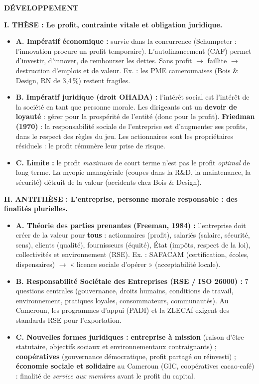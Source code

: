 \documentclass[11pt]{article}
\newcommand{\cle}[1]{{\popxbold\color{popdark}#1}}
\begin{document}
\begin{corrige}
\textbf{DÉVELOPPEMENT}

\textbf{I. THÈSE : Le profit, contrainte vitale et obligation juridique.}
\begin{itemize}
    \item \textbf{A. Impératif économique :} survie dans la concurrence (Schumpeter : l'innovation procure un profit temporaire). L'autofinancement (CAF) permet d'investir, d'innover, de rembourser les dettes. Sans profit $\rightarrow$ faillite $\rightarrow$ destruction d'emplois et de valeur. Ex. : les PME camerounaises (Bois \& Design, RN de 3,4\,\%) restent fragiles.
    \item \textbf{B. Impératif juridique (droit OHADA) :} l'\cle{intérêt social} est l'intérêt de la société en tant que personne morale. Les dirigeants ont un \textbf{devoir de loyauté} : gérer pour la prospérité de l'entité (donc pour le profit). \textbf{Friedman (1970)} : la responsabilité sociale de l'entreprise est d'augmenter ses profits, dans le respect des règles du jeu. Les actionnaires sont les propriétaires résiduels : le profit rémunère leur prise de risque.
    \item \textbf{C. Limite :} le profit \emph{maximum} de court terme n'est pas le profit \emph{optimal} de long terme. La myopie managériale (coupes dans la R\&D, la maintenance, la sécurité) détruit de la valeur (accidents chez Bois \& Design).
\end{itemize}

\textbf{II. ANTITHÈSE : L'entreprise, personne morale responsable : des finalités plurielles.}
\begin{itemize}
    \item \textbf{A. Théorie des parties prenantes (Freeman, 1984) :} l'entreprise doit créer de la valeur pour \textbf{tous} : actionnaires (profit), salariés (salaire, sécurité, sens), clients (qualité), fournisseurs (équité), État (impôts, respect de la loi), collectivités et environnement (RSE). Ex. : SAFACAM (certification, écoles, dispensaires) $\rightarrow$ « licence sociale d'opérer » (acceptabilité locale).
    \item \textbf{B. Responsabilité Sociétale des Entreprises (RSE / ISO 26000) :} 7 questions centrales (gouvernance, droits humains, conditions de travail, environnement, pratiques loyales, consommateurs, communautés). Au Cameroun, les programmes d'appui (PADI) et la ZLECAf exigent des standards RSE pour l'exportation.
    \item \textbf{C. Nouvelles formes juridiques :} \textbf{entreprise à mission} (raison d'être statutaire, objectifs sociaux et environnementaux contraignants) ; \textbf{coopératives} (gouvernance démocratique, profit partagé ou réinvesti) ; \textbf{économie sociale et solidaire} au Cameroun (GIC, coopératives cacao-café) : finalité de \emph{service aux membres} avant le profit du capital.
\end{itemize}


\end{corrige}
\end{document}
